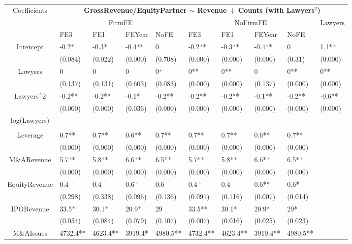 \documentclass{article}
\begin{document}
\begin{table}[H]
\centering
\begin{tabular}{|clllllllll|}
\hline
\multirow{3}{*}{Coefficients} & \multicolumn{9}{c|}{\textbf{GrossRevenue/EquityPartner $\sim$ Revenue + Counts (with Lawyers$^2$)}} \\
\cline{2-10}
& \multicolumn{4}{c}{FirmFE} & \multicolumn{4}{c}{NoFirmFE} & \multirow{2}{*}{Lawyers} \\
\cline{2-9}
& FE3 & FE1 & FEYear & NoFE & FE3 & FE1 & FEYear & NoFE &  \\
\hline
 
Intercept & -0.2$^{+}$ & -0.3* & -0.4** & 0 & -0.2** & -0.3** & -0.4** & 0 & 1.1** \\ 
   & (0.084) & (0.022) & (0.000) & (0.708) & (0.000) & (0.000) & (0.000) & (0.31) & (0.000) \\ 
  Lawyers & 0 & 0 & 0 & 0$^{+}$ & 0** & 0** & 0 & 0** & 0** \\ 
   & (0.137) & (0.131) & (0.603) & (0.083) & (0.000) & (0.000) & (0.137) & (0.000) & (0.000) \\ 
  Lawyers^2 & -0.2** & -0.2** & -0.1* & -0.2** & -0.2** & -0.2** & -0.1** & -0.2** & -0.6** \\ 
   & (0.000) & (0.000) & (0.036) & (0.000) & (0.000) & (0.000) & (0.000) & (0.000) & (0.000) \\ 
  log(Lawyers) &  &  &  &  &  &  &  &  &  \\ 
   &  &  &  &  &  &  &  &  &  \\ 
  Leverage & 0.7** & 0.7** & 0.6** & 0.7** & 0.7** & 0.7** & 0.6** & 0.7** &  \\ 
   & (0.000) & (0.000) & (0.000) & (0.000) & (0.000) & (0.000) & (0.000) & (0.000) &  \\ 
  M\&ARevenue & 5.7** & 5.8** & 6.6** & 6.5** & 5.7** & 5.8** & 6.6** & 6.5** &  \\ 
   & (0.000) & (0.000) & (0.000) & (0.000) & (0.000) & (0.000) & (0.000) & (0.000) &  \\ 
  EquityRevenue & 0.4 & 0.4 & 0.6$^{+}$ & 0.6 & 0.4$^{+}$ & 0.4 & 0.6** & 0.6* &  \\ 
   & (0.298) & (0.338) & (0.096) & (0.136) & (0.091) & (0.116) & (0.007) & (0.014) &  \\ 
  IPORevenue & 33.5$^{+}$ & 30.1$^{+}$ & 20.9$^{+}$ & 29 & 33.5** & 30.1* & 20.9* & 29* &  \\ 
   & (0.054) & (0.084) & (0.079) & (0.107) & (0.007) & (0.016) & (0.025) & (0.023) &  \\ 
  M\&AIssues & 4732.4** & 4623.4** & 3919.4* & 4980.5** & 4732.4** & 4623.4** & 3919.4** & 4980.5** &  \\ 

\end{tabular}
\end{table}
\end{document}
